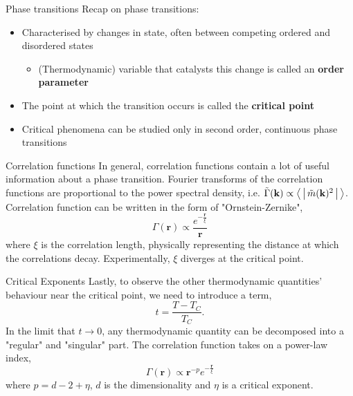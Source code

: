 \documentclass[aspectratio=169]{beamer}
\begin{document}
    \begin{frame}{Phase transitions}
        Recap on phase transitions:
        \begin{itemize}
            \item Characterised by changes in state, often between competing ordered and disordered states
            \begin{itemize}
                \item (Thermodynamic) variable that catalysts this change is called an \textbf{order parameter}
            \end{itemize}
            \item The point at which the transition occurs is called the \textbf{critical point}
            \item Critical phenomena can be studied only in second order, continuous phase transitions
        \end{itemize}
    \end{frame}

    \begin{frame}{Correlation functions}
        In general, correlation functions contain a lot of useful information about a phase transition. Fourier transforms of the correlation functions are proportional to the power spectral density, i.e. $\tilde{\Gamma}(\mathbf{k}) \propto \Braket{|\tilde{m}(\mathbf{k})^2|}$.
        Correlation function can be written in the form of "Ornstein-Zernike",
        \begin{equation}
            \Gamma(\mathbf{r}) \propto \frac{e^{-\frac{\mathbf{r}}{\xi}}}{\mathbf{r}}
        \end{equation}
        where $\xi$ is the correlation length, physically representing the distance at which the correlations decay. Experimentally, $\xi$ diverges at the critical point.
    \end{frame}

    \begin{frame}{Critical Exponents}
        Lastly, to observe the other thermodynamic quantities' behaviour near the critical point, we need to introduce a term,
        \begin{equation}
            t = \frac{T - T_C}{T_C}.
        \end{equation}
        In the limit that $t\rightarrow 0$, any thermodynamic quantity can be decomposed into a "regular" and "singular" part. The correlation function takes on a power-law index, 
        \begin{equation}
            \Gamma(\mathbf{r}) \propto \mathbf{r}^{-p}e^{-\frac{\mathbf{r}}{\xi}}
        \end{equation}
        where $p = d - 2 + \eta$, $d$ is the dimensionality and $\eta$ is a critical exponent.
    \end{frame}
\end{document}
